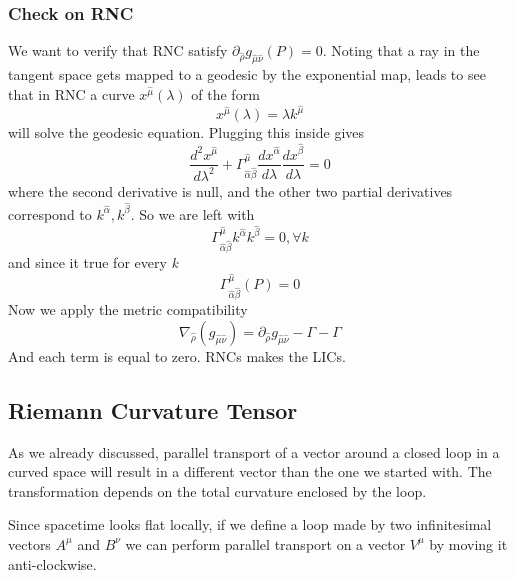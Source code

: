 \subsubsection{Check on RNC}
We want to verify that RNC satisfy $\partial_{\hat{\rho }} g_{\hat{\mu }\hat{\nu }}\left( P \right) = 0$. Noting that a ray  in the tangent space gets mapped to a geodesic by the exponential map, leads to see that in RNC a curve $x^{\hat{\mu }}\left( \lambda  \right)$ of the form
\[
x^{\hat{\mu }} \left( \lambda  \right) = \lambda k^{\hat{\mu }}
\]
will solve the geodesic equation.  Plugging this inside gives
\begin{equation}
\frac{d ^{2} x^{\hat{\mu }}}{d \lambda ^{2}} + \Gamma ^{\hat{\mu }}_{\hat{\alpha }\hat{\beta }} \frac{d x^{\hat{\alpha }}}{d \lambda }\frac{d x^{\hat{\beta }}}{d \lambda } = 0
\end{equation}
where the second derivative is null, and the other two partial derivatives correspond to $k^{\hat{\alpha }}, k^{\hat{\beta }}$. So we are left with
\begin{equation}
\Gamma ^{\hat{\mu }}_{\hat{\alpha }\hat{\beta }} k^{\hat{\alpha }}k^{\hat{\beta }} = 0, \forall k
\end{equation}
and since it true for every \emph{k}
\[
\Gamma ^{\hat{\mu }}_{\hat{\alpha }\hat{\beta }} \left( P \right) = 0
\]
Now we apply the metric compatibility
\begin{equation}
\nabla _{\hat{\rho }} \left( g_{\hat{\mu }\hat{\nu }} \right) = \partial_{\hat{\rho }} g_{\hat{\mu }\hat{\nu }} - \Gamma - \Gamma 
\end{equation}
And each term is equal to zero. RNCs makes the LICs.

\subsection{Riemann Curvature Tensor}

As we already discussed, parallel transport of a vector around a closed loop in a curved space will result in a different vector than the one we started with. The transformation depends on the total curvature enclosed by the loop. \par
Since spacetime looks flat locally, if we define a loop made by two infinitesimal vectors $A^{\mu }$ and $B^{\nu }$ we can  perform parallel transport on a vector $V^{\mu }$ by moving it anti-clockwise.


